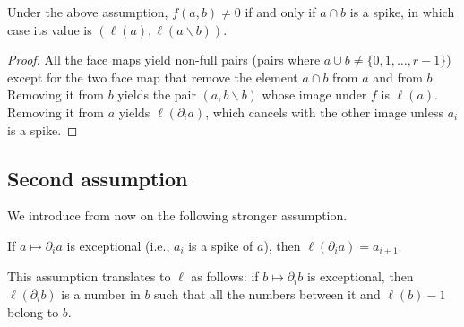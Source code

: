 \begin{lemma}
	Under the above assumption, $f(a,b) \neq 0$ if and only if $a\cap b$ is a spike, in which case its value is $(\ell(a),\ell(a\smallsetminus b))$.
\end{lemma}

\begin{proof}
	All the face maps yield non-full pairs (pairs where $a\cup b \neq \{0,1,\ldots,r-1\}$) except for the two face map that remove the element $a\cap b$ from $a$ and from $b$. Removing it from $b$ yields the pair $(a,b\smallsetminus b)$ whose image under $f$ is $\ell(a)$. Removing it from $a$ yields $\ell(\partial_i a)$, which cancels with the other image unless $a_i$ is a spike.
\end{proof}

\subsection{Second assumption}

We introduce from now on the following stronger assumption.

\begin{assumption}
	If $a\mapsto \partial_ia$ is exceptional (i.e., $a_i$ is a spike of $a$), then $\ell(\partial_i a) = a_{i+1}$.
\end{assumption}

\begin{remark}
	This assumption translates to $\bar{\ell}$ as follows: if $b\mapsto \partial_i b$ is exceptional, then $\ell(\partial_ib)$ is a number in $b$ such that all the numbers between it and $\ell(b)-1$ belong to $b$.
\end{remark}

